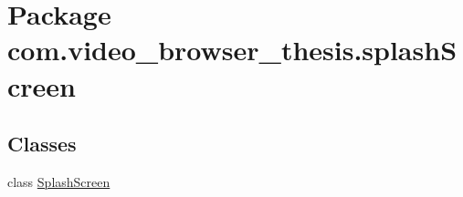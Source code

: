 \hypertarget{namespacecom_1_1video__browser__thesis_1_1splash_screen}{\section{Package com.\-video\-\_\-browser\-\_\-thesis.\-splash\-Screen}
\label{namespacecom_1_1video__browser__thesis_1_1splash_screen}
}
\subsection*{Classes}
\begin{DoxyCompactItemize}
\item 
class \hyperlink{classcom_1_1video__browser__thesis_1_1splash_screen_1_1_splash_screen}{Splash\-Screen}
\end{DoxyCompactItemize}
